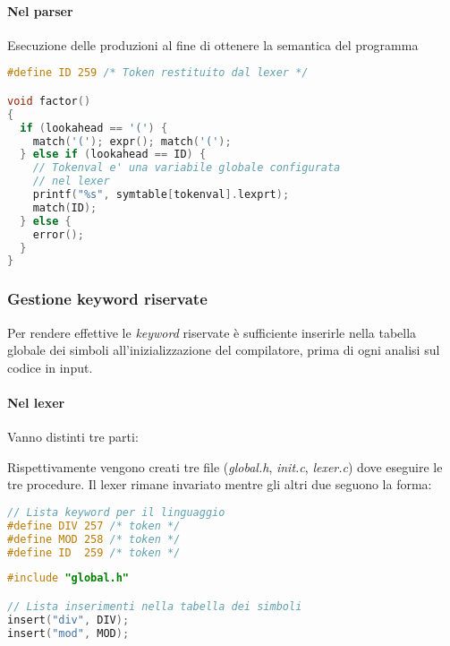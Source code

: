 \paragraph{Nel parser}
Esecuzione delle produzioni al fine di ottenere la semantica del programma
\begin{lstlisting}[language=C]
#define ID 259 /* Token restituito dal lexer */

void factor()
{
  if (lookahead == '(') {
    match('('); expr(); match('(');
  } else if (lookahead == ID) {
    // Tokenval e' una variabile globale configurata
    // nel lexer
    printf("%s", symtable[tokenval].lexprt);
    match(ID);
  } else {
    error();
  }
}
\end{lstlisting}

\subsubsection{Gestione keyword riservate}
Per rendere effettive le \textit{keyword} riservate è sufficiente inserirle
nella tabella globale dei simboli all'inizializzazione del compilatore, prima
di ogni analisi sul codice in input.

\paragraph{Nel lexer}
Vanno distinti tre parti:

Rispettivamente vengono creati tre file (\textit{global.h}, \textit{init.c},
\textit{lexer.c}) dove eseguire le tre procedure. Il lexer rimane invariato
mentre gli altri due seguono la forma:
\begin{lstlisting}[language=C,caption=global.h]
// Lista keyword per il linguaggio
#define DIV 257 /* token */
#define MOD 258 /* token */
#define ID  259 /* token */
\end{lstlisting}

\begin{lstlisting}[language=C,caption=init.c]
#include "global.h"

// Lista inserimenti nella tabella dei simboli
insert("div", DIV);
insert("mod", MOD);
\end{lstlisting}


